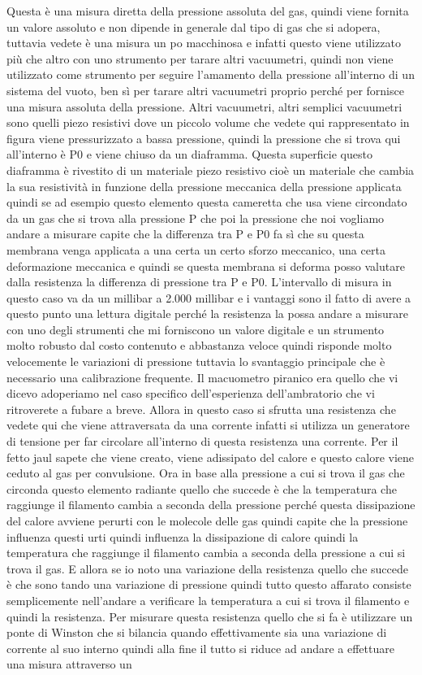 Questa è una misura diretta della pressione assoluta del gas, quindi viene fornita un valore assoluto e non dipende in generale dal tipo di gas che si adopera, tuttavia vedete è una misura un po macchinosa e infatti questo viene utilizzato più che altro con uno strumento per tarare altri vacuumetri, quindi non viene utilizzato come strumento per seguire l'amamento della pressione all'interno di un sistema del vuoto, ben sì per tarare altri vacuumetri proprio perché per fornisce una misura assoluta della pressione. Altri vacuumetri, altri semplici vacuumetri sono quelli piezo resistivi dove un piccolo volume che vedete qui rappresentato in figura viene pressurizzato a bassa pressione, quindi la pressione che si trova qui all'interno è P0 e viene chiuso da un diaframma. Questa superficie questo diaframma è rivestito di un materiale piezo resistivo cioè un materiale che cambia la sua resistività in funzione della pressione meccanica della pressione applicata quindi se ad esempio questo elemento questa cameretta che usa viene circondato da un gas che si trova alla pressione P che poi la pressione che noi vogliamo andare a misurare capite che la differenza tra P e P0 fa sì che su questa membrana venga applicata a una certa un certo sforzo meccanico, una certa deformazione meccanica e quindi se questa membrana si deforma posso valutare dalla resistenza la differenza di pressione tra P e P0. L'intervallo di misura in questo caso va da un millibar a 2.000 millibar e i vantaggi sono il fatto di avere a questo punto una lettura digitale perché la resistenza la possa andare a misurare con uno degli strumenti che mi forniscono un valore digitale e un strumento molto robusto dal costo contenuto e abbastanza veloce quindi risponde molto velocemente le variazioni di pressione tuttavia lo svantaggio principale che è necessario una calibrazione frequente. Il macuometro piranico era quello che vi dicevo adoperiamo nel caso specifico dell'esperienza dell'ambratorio che vi ritroverete a fubare a breve. Allora in questo caso si sfrutta una resistenza che vedete qui che viene attraversata da una corrente infatti si utilizza un generatore di tensione per far circolare all'interno di questa resistenza una corrente. Per il fetto jaul sapete che viene creato, viene adissipato del calore e questo calore viene ceduto al gas per convulsione. Ora in base alla pressione a cui si trova il gas che circonda questo elemento radiante quello che succede è che la temperatura che raggiunge il filamento cambia a seconda della pressione perché questa dissipazione del calore avviene perurti con le molecole delle gas quindi capite che la pressione influenza questi urti quindi influenza la dissipazione di calore quindi la temperatura che raggiunge il filamento cambia a seconda della pressione a cui si trova il gas. E allora se io noto una variazione della resistenza quello che succede è che sono tando una variazione di pressione quindi tutto questo affarato consiste semplicemente nell'andare a verificare la temperatura a cui si trova il filamento e quindi la resistenza. Per misurare questa resistenza quello che si fa è utilizzare un ponte di Winston che si bilancia quando effettivamente sia una variazione di corrente al suo interno quindi alla fine il tutto si riduce ad andare a effettuare una misura attraverso un 